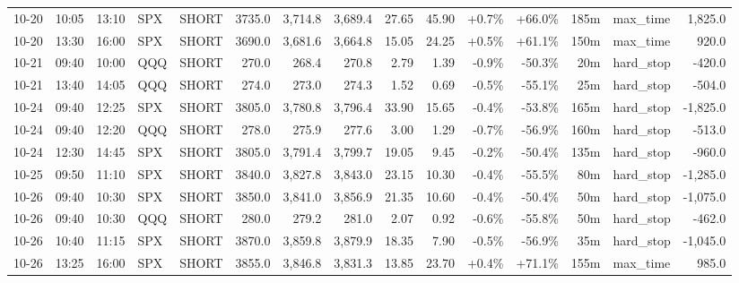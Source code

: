 \documentclass[11pt,a4paper,twoside]{article}
\begin{document}
\begin{landscape}
\begin{center}
\begin{longtable}{>{\color{txtmain}}l l l l l r r r r r r r r >{\color{txtmain}}l r}
10-20 & 10:05 & 13:10 & SPX & SHORT & 3735.0 & 3,714.8 & 3,689.4 & 27.65 & 45.90 & \textcolor{wingreen}{+0.7\%} & \textcolor{wingreen}{+66.0\%} & 185m & max\_time & \textcolor{wingreen}{1,825.0} \\
10-20 & 13:30 & 16:00 & SPX & SHORT & 3690.0 & 3,681.6 & 3,664.8 & 15.05 & 24.25 & \textcolor{wingreen}{+0.5\%} & \textcolor{wingreen}{+61.1\%} & 150m & max\_time & \textcolor{wingreen}{920.0} \\
10-21 & 09:40 & 10:00 & QQQ & SHORT & 270.0 & 268.4 & 270.8 & 2.79 & 1.39 & \textcolor{lossred}{-0.9\%} & \textcolor{lossred}{-50.3\%} & 20m & hard\_stop & \textcolor{lossred}{-420.0} \\
10-21 & 13:40 & 14:05 & QQQ & SHORT & 274.0 & 273.0 & 274.3 & 1.52 & 0.69 & \textcolor{lossred}{-0.5\%} & \textcolor{lossred}{-55.1\%} & 25m & hard\_stop & \textcolor{lossred}{-504.0} \\
10-24 & 09:40 & 12:25 & SPX & SHORT & 3805.0 & 3,780.8 & 3,796.4 & 33.90 & 15.65 & \textcolor{lossred}{-0.4\%} & \textcolor{lossred}{-53.8\%} & 165m & hard\_stop & \textcolor{lossred}{-1,825.0} \\
10-24 & 09:40 & 12:20 & QQQ & SHORT & 278.0 & 275.9 & 277.6 & 3.00 & 1.29 & \textcolor{lossred}{-0.7\%} & \textcolor{lossred}{-56.9\%} & 160m & hard\_stop & \textcolor{lossred}{-513.0} \\
10-24 & 12:30 & 14:45 & SPX & SHORT & 3805.0 & 3,791.4 & 3,799.7 & 19.05 & 9.45 & \textcolor{lossred}{-0.2\%} & \textcolor{lossred}{-50.4\%} & 135m & hard\_stop & \textcolor{lossred}{-960.0} \\
10-25 & 09:50 & 11:10 & SPX & SHORT & 3840.0 & 3,827.8 & 3,843.0 & 23.15 & 10.30 & \textcolor{lossred}{-0.4\%} & \textcolor{lossred}{-55.5\%} & 80m & hard\_stop & \textcolor{lossred}{-1,285.0} \\
10-26 & 09:40 & 10:30 & SPX & SHORT & 3850.0 & 3,841.0 & 3,856.9 & 21.35 & 10.60 & \textcolor{lossred}{-0.4\%} & \textcolor{lossred}{-50.4\%} & 50m & hard\_stop & \textcolor{lossred}{-1,075.0} \\
10-26 & 09:40 & 10:30 & QQQ & SHORT & 280.0 & 279.2 & 281.0 & 2.07 & 0.92 & \textcolor{lossred}{-0.6\%} & \textcolor{lossred}{-55.8\%} & 50m & hard\_stop & \textcolor{lossred}{-462.0} \\
10-26 & 10:40 & 11:15 & SPX & SHORT & 3870.0 & 3,859.8 & 3,879.9 & 18.35 & 7.90 & \textcolor{lossred}{-0.5\%} & \textcolor{lossred}{-56.9\%} & 35m & hard\_stop & \textcolor{lossred}{-1,045.0} \\
10-26 & 13:25 & 16:00 & SPX & SHORT & 3855.0 & 3,846.8 & 3,831.3 & 13.85 & 23.70 & \textcolor{wingreen}{+0.4\%} & \textcolor{wingreen}{+71.1\%} & 155m & max\_time & \textcolor{wingreen}{985.0} \\

\end{longtable}
\end{center}
\end{landscape}
\end{document}
